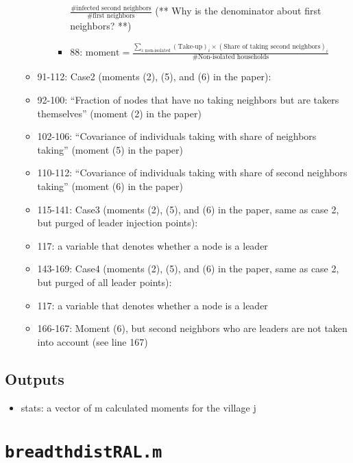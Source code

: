 \documentclass[10pt,letterpaper]{article}
\begin{document}
\begin{itemize}
\begin{itemize}
\begin{itemize}
\begin{itemize}
                $\frac{\text{\# infected second neighbors}}{\text{\# first neighbors}}$ (** Why is the denominator about first neighbors? **)
              \item 88: $\text{moment} = \frac{\sum_{i: \text{non-isolated}} (\text{Take-up})_i \times (\text{Share of taking second neighbors})_i}{\text{\# Non-isolated households}}$
            \end{itemize}
        \end{itemize}
      \item 91-112: Case2 (moments (2), (5), and (6) in the paper):
          \item 92-100: ``Fraction of nodes that have no taking neighbors but are takers themselves'' (moment (2) in the paper)
          \item 102-106: ``Covariance of individuals taking with share of neighbors taking'' (moment (5) in the paper)
          \item 110-112: ``Covariance of individuals taking with share of second neighbors taking'' (moment (6) in the paper)
      \item 115-141: Case3 (moments (2), (5), and (6) in the paper, same as case 2, but purged of leader injection points):
          \item 117: a variable that denotes whether a node is a leader
      \item 143-169: Case4 (moments (2), (5), and (6) in the paper, same as case 2, but purged of all leader points):
          \item 117: a variable that denotes whether a node is a leader
          \item 166-167: Moment (6), but second neighbors who are leaders are not taken into account (see line 167)
    \end{itemize}
\end{itemize}

\subsection*{Outputs}
\begin{itemize}
	\item stats: a vector of m calculated moments for the village j
\end{itemize}

\section{\texttt{breadthdistRAL.m}}\label{breadthdistRAL}
\end{document}
